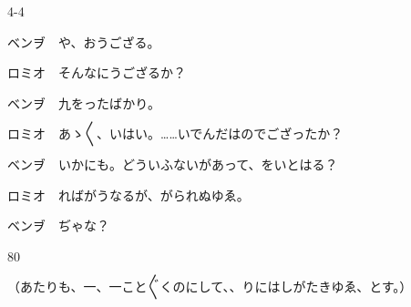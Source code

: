 \documentclass[tate,paper=b6j,jafontsize=9pt]{jlreq}
\begin{document}
\begin{azconvIndented}{4\zw}{-4\zw}

ベンヺ　や、おうござる。

ロミオ　そんなにうござるか？

ベンヺ　九をったばかり。

ロミオ　あゝ{〳〵}、いはい。……いでんだはのでござったか？

ベンヺ　いかにも。どういふないがあって、をいとはる？

ロミオ　ればがうなるが、がられぬゆゑ。

ベンヺ　ぢゃな？

\end{azconvIndented}
\begin{azconvIndented}{8\zw}{0\zw}

（あたりも、一、一こと{〴〵}くのにして、、りにはしがたきゆゑ、とす。）

\end{azconvIndented}
\end{document}

